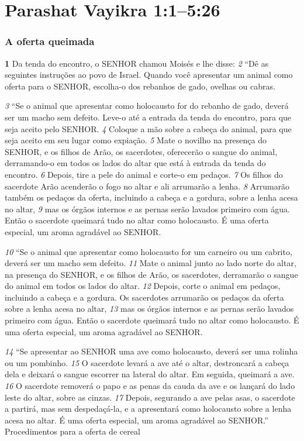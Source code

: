 \section*{Parashat Vayikra 1:1–5:26}    

\bigskip
\subsubsection*{A oferta queimada}
\textbf{\large 1} Da tenda do encontro, o SENHOR chamou Moisés e lhe disse: 
\textit{\tiny 2} 
“Dê as seguintes
instruções ao povo de Israel. Quando você apresentar um animal como oferta
para o SENHOR, escolha-o dos rebanhos de gado, ovelhas ou cabras. 

\smallskip
\textit{\tiny 3} 
“Se o animal que apresentar como holocausto for do rebanho de gado, deverá
ser um macho sem defeito. Leve-o até a entrada da tenda do encontro, para que
seja aceito pelo SENHOR. 
\textit{\tiny 4} 
Coloque a mão sobre a cabeça do animal, para que seja
aceito em seu lugar como expiação. 
\textit{\tiny 5} 
Mate o novilho na presença do SENHOR, e os
filhos de Arão, os sacerdotes, oferecerão o sangue do animal, derramando-o em
todos os lados do altar que está à entrada da tenda do encontro. 
\textit{\tiny 6} 
Depois, tire a
pele do animal e corte-o em pedaços. 
\textit{\tiny 7} 
Os filhos do sacerdote Arão acenderão o
fogo no altar e ali arrumarão a lenha. 
\textit{\tiny 8} 
Arrumarão também os pedaços da oferta,
incluindo a cabeça e a gordura, sobre a lenha acesa no altar, 
\textit{\tiny 9} 
mas os órgãos
internos e as pernas serão lavados primeiro com água. Então o sacerdote
queimará tudo no altar como holocausto. É uma oferta especial, um aroma
agradável ao SENHOR.
   
\smallskip
\textit{\tiny 10}
“Se o animal que apresentar como holocausto for um carneiro ou um cabrito,
deverá ser um macho sem defeito. 
\textit{\tiny 11}
Mate o animal junto ao lado norte do altar,
na presença do SENHOR, e os filhos de Arão, os sacerdotes, derramarão o sangue do
animal em todos os lados do altar. 
\textit{\tiny 12}
Depois, corte o animal em pedaços, incluindo
a cabeça e a gordura. Os sacerdotes arrumarão os pedaços da oferta sobre a lenha
acesa no altar, 
\textit{\tiny 13}
mas os órgãos internos e as pernas serão lavados primeiro com
água. Então o sacerdote queimará tudo no altar como holocausto. É uma oferta
especial, um aroma agradável ao SENHOR.

\smallskip
\textit{\tiny 14}
“Se apresentar ao SENHOR uma ave como holocausto, deverá ser uma rolinha
ou um pombinho. 
\textit{\tiny 15}
O sacerdote levará a ave até o altar, destroncará a cabeça dela
e deixará o sangue escorrer na lateral do altar. Em seguida, queimará a ave. 
\textit{\tiny 16}
O
sacerdote removerá o papo e as penas da cauda da ave e os lançará do lado leste
do altar, sobre as cinzas. 
\textit{\tiny 17}
Depois, segurando a ave pelas asas, o sacerdote a
partirá, mas sem despedaçá-la, e a apresentará como holocausto sobre a lenha
acesa no altar. É uma oferta especial, um aroma agradável ao SENHOR.”
Procedimentos para a oferta de cereal
   
